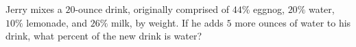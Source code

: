 Jerry mixes a $20$-ounce drink, originally comprised of $44\%$ eggnog, $20\%$ water, $10\%$ lemonade, and $26\%$ milk, by weight. If he adds $5$ more ounces of water to his drink, what percent of the new drink is water?
